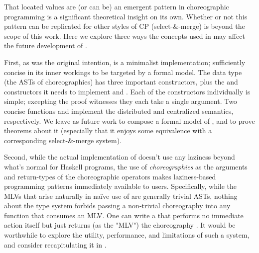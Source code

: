 That located values are (or can be) an emergent pattern in choreographic programming is a significant theoretical insight on its own.
Whether or not this pattern can be replicated for other styles of CP (\eg select-\&-merge) is beyond the scope of this work.
Here we explore three ways the concepts used in \minichor may affect the future development of \MultiChor.

First, as was the original intention, \minichor is a minimalist implementation;
sufficiently concise in its inner workings to be targeted by a formal model.
The  data type (the ASTs of choreographies) has three important constructors,
plus the  and  constructors it needs to implement  and .
Each of the constructors individually is simple;
excepting the proof witnesses they each take a single argument.
Two concise functions  and  implement the distributed and centralized semantics, respectively.
We leave as future work to compose a formal model of \minichor,
and to prove theorems about it
(especially that it enjoys some equivalence with a corresponding select-\&-merge system).
 
Second, while the actual implementation of \minichor doesn't use any laziness beyond what's normal for Haskell programs,
the use of \emph{choreographies} as the arguments and return-types of the choreographic operators
makes laziness-based programming patterns immediately available to users.
Specifically, while the MLVs that arise naturally in naïve use of \minichor are generally trivial  ASTs,
nothing about the type system forbids passing a non-trivial choreography into any function that consumes an MLV.
One can write a  that performs no immediate action itself but just returns
(as the "MLV") the choreography .
It would be worthwhile to explore the utility, performance, and limitations of such a system,
and consider recapitulating it in \MultiChor.

